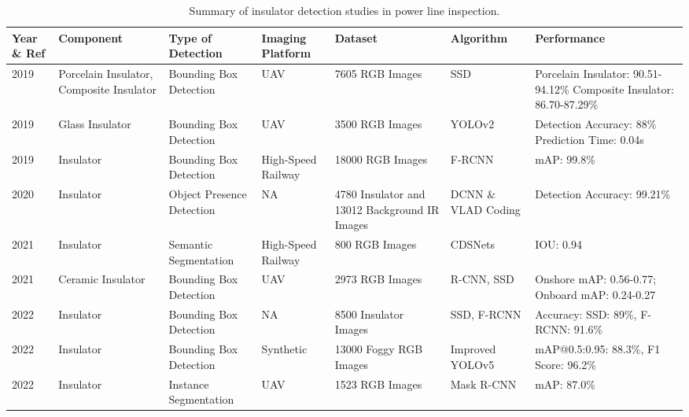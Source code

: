 \begin{table*}[htb]
\scriptsize
\caption{Summary of insulator detection studies in power line inspection.} \label{tab:insulator_detection} 
\begin{tabular}{P{.05} P{.1} P{.15} P{.1} P{.15} P{.1} P{.15}}

\hline
Year \& Ref & Component & Type of Detection & Imaging Platform & Dataset & Algorithm & Performance \\
 \cite{miao_insulator_2019} & Porcelain Insulator, Composite Insulator & Bounding Box Detection & UAV & 7605 RGB Images & SSD & Porcelain Insulator: 90.51-94.12\% Composite Insulator: 86.70-87.29\% \\

2019 \cite{sadykova2019yolo} & Glass Insulator & Bounding Box Detection & UAV & 3500 RGB Images  & YOLOv2 & Detection Accuracy: 88\% Prediction Time: 0.04s \\

2019 \cite{kang_deep_2019} & Insulator & Bounding Box Detection & High-Speed Railway & 18000 RGB Images  & F-RCNN & mAP: 99.8\% \\

2020 \cite{zhao2020image} & Insulator & Object Presence Detection & NA & 4780 Insulator and 13012 Background IR Images  & DCNN \& VLAD Coding & Detection Accuracy: 99.21\% \\

2021 \cite{zhang_defgan_2021} & Insulator & Semantic Segmentation & High-Speed Railway & 800 RGB Images  & CDSNets & IOU: 0.94 \\

2021 \cite{waleed_drone_based_2021} & Ceramic Insulator & Bounding Box Detection & UAV & 2973 RGB Images & R-CNN, SSD & Onshore mAP: 0.56-0.77; Onboard mAP: 0.24-0.27 \\

2022 \cite{wei_online_2022} & Insulator & Bounding Box Detection & NA & 8500 Insulator Images & SSD, F-RCNN  & Accuracy: SSD: 89\%, F-RCNN: 91.6\% \\

2022 \cite{zhang_finet_2022} & Insulator & Bounding Box Detection & Synthetic & 13000 Foggy RGB Images & Improved YOLOv5 & mAP@0.5:0.95: 88.3\%, F1 Score: 96.2\%  \\

2022 \cite{antwi_bekoe_deep_2022} & Insulator & Instance Segmentation & UAV & 1523 RGB Images & Mask R-CNN & mAP: 87.0\% \\


\end{tabular}
\end{table*}
